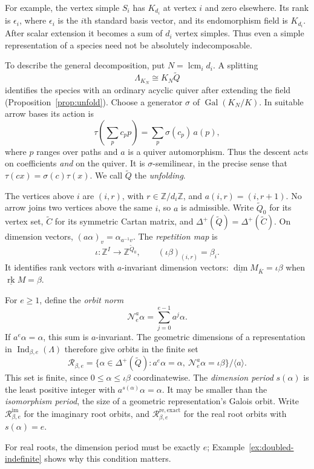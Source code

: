 \documentclass[11pt, reqno]{amsart}
\numberwithin{equation}{section}
\theoremstyle{definition}
\theoremstyle{remark}
\newcommand{\op}[1]{\operatorname{#1}}
\newcommand{\mr}[1]{\mathrm{#1}}
\newcommand{\mb}[1]{\mathbb{#1}}
\newcommand{\mc}[1]{\mathcal{#1}}
\newcommand{\ms}[1]{\mathscr{#1}}
\newcommand{\Ind}{\op{Ind}}
\newcommand{\rk}{\underline{\op{rk}}}
\newcommand{\dimv}{\underline{\dim}}
\newcommand{\Gal}{\op{Gal}}
\newcommand{\lcm}{\op{lcm}}
\newcommand{\Qbar}{\widetilde Q}
\newcommand{\Kbar}{\overline K}
\newcommand{\iso}{\cong}
\begin{document}
For example, the vertex simple $S_i$ has $K_{d_i}$ at vertex $i$ and
zero elsewhere. Its rank is $\epsilon_i$, where $\epsilon_i$ is the
$i$th standard basis vector, and its endomorphism field is $K_{d_i}$.
After scalar extension it becomes a sum of $d_i$ vertex simples.
Thus even a simple representation of a species need not be absolutely
indecomposable.

To describe the general decomposition, put $N=\lcm_i d_i$. A splitting
\[ \Lambda_{K_N}\iso K_N\Qbar \]
identifies the species with an ordinary acyclic quiver after extending
the field (Proposition~\ref{prop:unfold}). Choose a generator $\sigma$
of $\Gal(K_N/K)$. In suitable arrow bases its action is
\[ \tau\!\left(\sum_p c_p p\right)=\sum_p\sigma(c_p)\,a(p), \]
where $p$ ranges over paths and $a$ is a quiver automorphism. Thus the
descent acts on coefficients \emph{and} on the quiver. It is
$\sigma$-semilinear, in the precise sense that
$\tau(cx)=\sigma(c)\tau(x)$. We call $\Qbar$ the \emph{unfolding}.

The vertices above $i$ are $(i,r)$, with
$r\in\mb Z/d_i\mb Z$, and $a(i,r)=(i,r+1)$. No arrow joins
two vertices above the same $i$, so $a$ is admissible. Write $\Qbar_0$ for its vertex set,
$\widetilde C$ for its symmetric Cartan matrix, and
$\Delta^+(\Qbar)=\Delta^+(\widetilde C)$. On dimension vectors,
$(a\alpha)_v=\alpha_{a^{-1}v}$. The \emph{repetition map} is
\[ \iota:\mb Z^I\longrightarrow\mb Z^{\Qbar_0},\qquad (\iota\beta)_{(i,r)}=\beta_i. \]
It identifies rank vectors with $a$-invariant dimension vectors:
$\dimv M_{\Kbar}=\iota\beta$ when $\rk M=\beta$.

For $e\ge1$, define the \emph{orbit norm}
\[ \mc N_e^a\alpha=\sum_{j=0}^{e-1}a^j\alpha. \]
If $a^e\alpha=\alpha$, this sum is $a$-invariant. The geometric
dimensions of a representation in $\Ind_{\beta,e}(\Lambda)$ therefore
give orbits in the finite set
\[ \ms R_{\beta,e}=\{\alpha\in\Delta^+(\Qbar):a^e\alpha=\alpha,\ \mc N_e^a\alpha=\iota\beta\}/\langle a\rangle. \]
This set is finite, since $0\le\alpha\le\iota\beta$ coordinatewise.
The \emph{dimension period} $s(\alpha)$ is the least positive integer
with $a^{s(\alpha)}\alpha=\alpha$. It may be smaller than the
\emph{isomorphism period}, the size of a geometric representation's
Galois orbit. Write $\ms R^{\mr{im}}_{\beta,e}$ for the
imaginary root orbits, and $\ms R^{\mr{re,exact}}_{\beta,e}$
for the real root orbits with $s(\alpha)=e$.

For real roots, the dimension period must be exactly $e$;
Example~\ref{ex:doubled-indefinite} shows why this condition matters.
\end{document}

